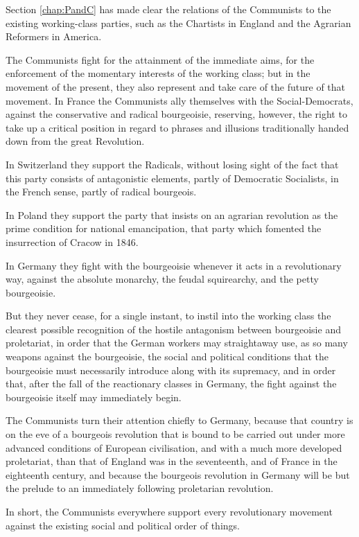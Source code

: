 Section \ref{chap:PandC} has made clear the relations of the Communists to the
existing working-class parties, such as the Chartists in England and
the Agrarian Reformers in America.

The Communists fight for the attainment of the immediate aims, for the
enforcement of the momentary interests of the working class; but in the
movement of the present, they also represent and take care of the
future of that movement. In France the Communists ally themselves with
the Social-Democrats, against the conservative and radical bourgeoisie,
reserving, however, the right to take up a critical position in regard
to phrases and illusions traditionally handed down from the great
Revolution.

In Switzerland they support the Radicals, without losing sight of the
fact that this party consists of antagonistic elements, partly of
Democratic Socialists, in the French sense, partly of radical
bourgeois.

In Poland they support the party that insists on an agrarian revolution
as the prime condition for national emancipation, that party which
fomented the insurrection of Cracow in 1846.

In Germany they fight with the bourgeoisie whenever it acts in a
revolutionary way, against the absolute monarchy, the feudal
squirearchy, and the petty bourgeoisie.

But they never cease, for a single instant, to instil into the working
class the clearest possible recognition of the hostile antagonism
between bourgeoisie and proletariat, in order that the German workers
may straightaway use, as so many weapons against the bourgeoisie, the
social and political conditions that the bourgeoisie must necessarily
introduce along with its supremacy, and in order that, after the fall
of the reactionary classes in Germany, the fight against the
bourgeoisie itself may immediately begin.

The Communists turn their attention chiefly to Germany, because that
country is on the eve of a bourgeois revolution that is bound to be
carried out under more advanced conditions of European civilisation,
and with a much more developed proletariat, than that of England was in
the seventeenth, and of France in the eighteenth century, and because
the bourgeois revolution in Germany will be but the prelude to an
immediately following proletarian revolution.

In short, the Communists everywhere support every revolutionary
movement against the existing social and political order of things.

